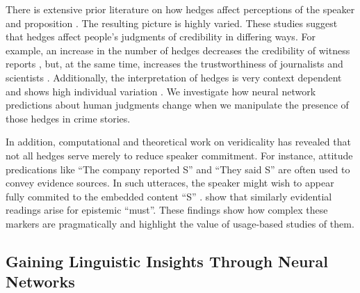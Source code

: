 \documentclass[11pt,a4paper]{article}
\begin{document}
There is extensive prior literature on how hedges affect perceptions of the speaker and proposition \citep{Erickson-etal:1978, durik2008effects, bonnefon2006tactful, rubin:2007:ShortPapers, jensen2008scientific, ferson2015natural}.  The resulting picture is highly varied. 
These studies suggest that hedges affect people's judgments of credibility in differing ways. For example, an increase in the number of hedges decreases the credibility of witness reports \citep{Erickson-etal:1978}, but, at the same time, increases the trustworthiness of journalists and scientists \citep{jensen2008scientific}. Additionally, the interpretation of hedges is very context dependent \citep{bonnefon2006tactful,durik2008effects,ferson2015natural} and shows high individual variation \citep{rubin:2007:ShortPapers,ferson2015natural}. 
We investigate how neural network predictions about human judgments change when we manipulate the presence of those hedges in crime stories.

In addition, computational and theoretical work on veridicality has revealed that not all hedges serve merely to reduce speaker commitment. For instance, attitude predications like ``The company reported S'' and ``They said S'' are often used to convey evidence sources. In such utteraces, the speaker might wish to appear fully commited to the embedded content ``S'' \citep{Simons07,deMarneffe:Manning:Potts:2012,White:Rawlins:2018,White-etal:2018}. \citet{vonFintel:Gillies:2010} show that similarly evidential readings arise for epistemic ``must''. These findings show how complex these markers are pragmatically and highlight the value of usage-based studies of them.


\subsection{Gaining Linguistic Insights Through Neural Networks}
\end{document}
